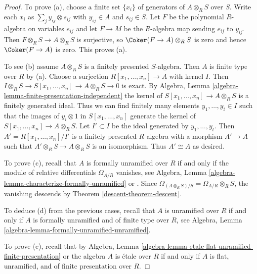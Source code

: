 \begin{proof}

To prove (a), choose a finite set $\{x_i\}$ of generators of $A \otimes_R S$
over $S$. Write each $x_i$ as $\sum_j y_{ij} \otimes s_{ij}$ with
$y_{ij} \in A$ and $s_{ij} \in S$. Let $F$ be the polynomial $R$-algebra
on variables $e_{ij}$ and let $F \to M$ be the $R$-algebra map sending
$e_{ij}$ to $y_{ij}$. Then $F \otimes_R S\to A \otimes_R S$ is surjective, so
$\Coker(F \to A) \otimes_R S$ is zero and hence $\Coker(F \to A)$
is zero. This proves (a).

\medskip\noindent
To see (b) assume $A \otimes_R S$ is a finitely presented $S$-algebra.
Then $A$ is finite type over $R$ by (a). Choose a surjection
$R[x_1, \ldots, x_n] \to A$ with kernel $I$.
Then $I \otimes_R S \to S[x_1, \ldots, x_n] \to A \otimes_R S \to 0$ is exact.
By Algebra, Lemma \ref{algebra-lemma-finite-presentation-independent}
the kernel of $S[x_1, \ldots, x_n] \to A \otimes_R S$
is a finitely generated ideal. Thus we can find finitely many elements
$y_1, \ldots, y_t \in I$ such that the images of $y_i \otimes 1$ in
$S[x_1, \ldots, x_n]$ generate the kernel of
$S[x_1, \ldots, x_n] \to A \otimes_R S$.
Let $I' \subset I$ be the ideal generated by $y_1, \ldots, y_t$.
Then $A' = R[x_1, \ldots, x_n]/I'$ is a finitely presented $R$-algebra
with a morphism $A' \to A$ such that $A' \otimes_R S \to A \otimes_R S$
is an isomorphism. Thus $A' \cong A$ as desired.

\medskip\noindent
To prove (c), recall that $A$ is formally unramified over $R$ if and only
if the module of relative differentials $\Omega_{A/R}$ vanishes, see
Algebra, Lemma \ref{algebra-lemma-characterize-formally-unramified} or
\cite[Proposition~17.2.1]{EGA4}.
Since $\Omega_{(A \otimes_R S)/S} = \Omega_{A/R} \otimes_R S$,
the vanishing descends by Theorem \ref{descent-theorem-descent}.

\medskip\noindent
To deduce (d) from the previous cases, recall that $A$ is unramified
over $R$ if and only if $A$ is formally unramified and of finite type
over $R$, see
Algebra, Lemma \ref{algebra-lemma-formally-unramified-unramified}.

\medskip\noindent
To prove (e), recall that by
Algebra, Lemma \ref{algebra-lemma-etale-flat-unramified-finite-presentation}
or \cite[Th\'eor\`eme~17.6.1]{EGA4} the algebra
$A$ is \'etale over $R$ if and only if
$A$ is flat, unramified, and of finite presentation over $R$.
\end{proof}

